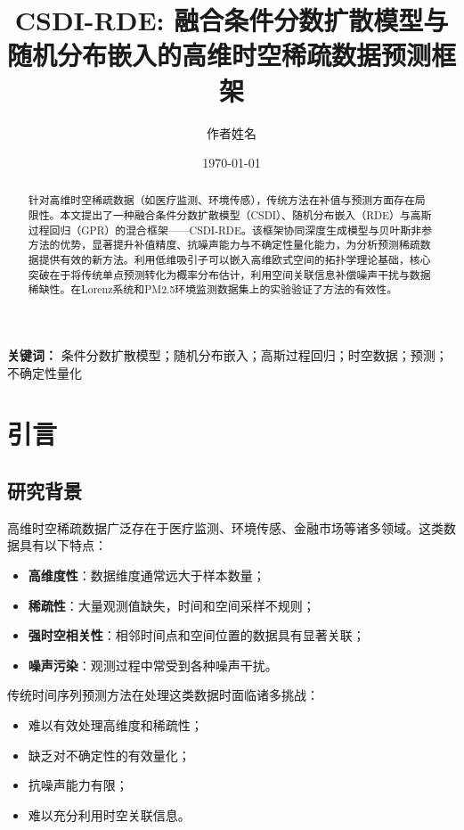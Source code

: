\documentclass[12pt,a4paper]{article}
\title{CSDI-RDE: 融合条件分数扩散模型与随机分布嵌入的高维时空稀疏数据预测框架}
\author{作者姓名}
\date{\today}
\begin{document}
\maketitle

\begin{abstract}
针对高维时空稀疏数据（如医疗监测、环境传感），传统方法在补值与预测方面存在局限性。本文提出了一种融合条件分数扩散模型（CSDI）、随机分布嵌入（RDE）与高斯过程回归（GPR）的混合框架——CSDI-RDE。该框架协同深度生成模型与贝叶斯非参方法的优势，显著提升补值精度、抗噪声能力与不确定性量化能力，为分析预测稀疏数据提供有效的新方法。利用低维吸引子可以嵌入高维欧式空间的拓扑学理论基础，核心突破在于将传统单点预测转化为概率分布估计，利用空间关联信息补偿噪声干扰与数据稀缺性。在Lorenz系统和PM2.5环境监测数据集上的实验验证了方法的有效性。
\end{abstract}

\noindent\textbf{关键词：} 条件分数扩散模型；随机分布嵌入；高斯过程回归；时空数据；预测；不确定性量化

\section{引言}

\subsection{研究背景}

高维时空稀疏数据广泛存在于医疗监测、环境传感、金融市场等诸多领域。这类数据具有以下特点：
\begin{itemize}
    \item \textbf{高维度性}：数据维度通常远大于样本数量；
    \item \textbf{稀疏性}：大量观测值缺失，时间和空间采样不规则；
    \item \textbf{强时空相关性}：相邻时间点和空间位置的数据具有显著关联；
    \item \textbf{噪声污染}：观测过程中常受到各种噪声干扰。
\end{itemize}

传统时间序列预测方法在处理这类数据时面临诸多挑战：
\begin{itemize}
    \item 难以有效处理高维度和稀疏性；
    \item 缺乏对不确定性的有效量化；
    \item 抗噪声能力有限；
    \item 难以充分利用时空关联信息。
\end{itemize}
\end{document}
